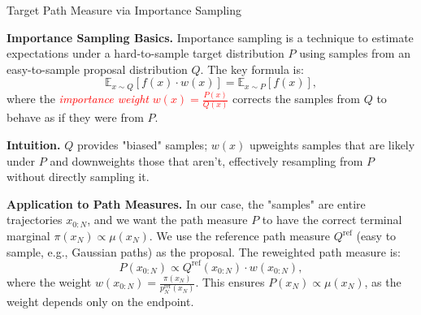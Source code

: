 \documentclass[aspectratio=169,xcolor=dvipsnames]{beamer}
\begin{document}
\begin{frame}[t]{Target Path Measure via Importance Sampling}
\footnotesize

\textbf{Importance Sampling Basics.} Importance sampling is a technique to estimate expectations under a hard-to-sample target distribution \( P \) using samples from an easy-to-sample proposal distribution \( Q \). The key formula is:
\[
\mathbb{E}_{x \sim Q} \left[ f(x) \cdot w(x) \right] = \mathbb{E}_{x \sim P} [f(x)],
\]
where the \textcolor{red}{\emph{importance weight} \( w(x) = \frac{P(x)}{Q(x)} \)} corrects the samples from \( Q \) to behave as if they were from \( P \).

\textbf{Intuition.} \( Q \) provides "biased" samples; \( w(x) \) upweights samples that are likely under \( P \) and downweights those that aren't, effectively resampling from \( P \) without directly sampling it.

\textbf{Application to Path Measures.} In our case, the "samples" are entire trajectories \( x_{0:N} \), and we want the path measure \( P \) to have the correct terminal marginal \( \pi(x_N) \propto \mu(x_N) \). We use the reference path measure \( Q^{\text{ref}} \) (easy to sample, e.g., Gaussian paths) as the proposal. The reweighted path measure is:
\[
P(x_{0:N}) \propto Q^{\text{ref}}(x_{0:N}) \cdot w(x_{0:N}),
\]
where the weight \( w(x_{0:N}) = \frac{\pi(x_N)}{p^{\text{ref}}_N(x_N)} \). This ensures \( P(x_N) \propto \mu(x_N) \), as the weight depends only on the endpoint.

\end{frame}



\end{document}
